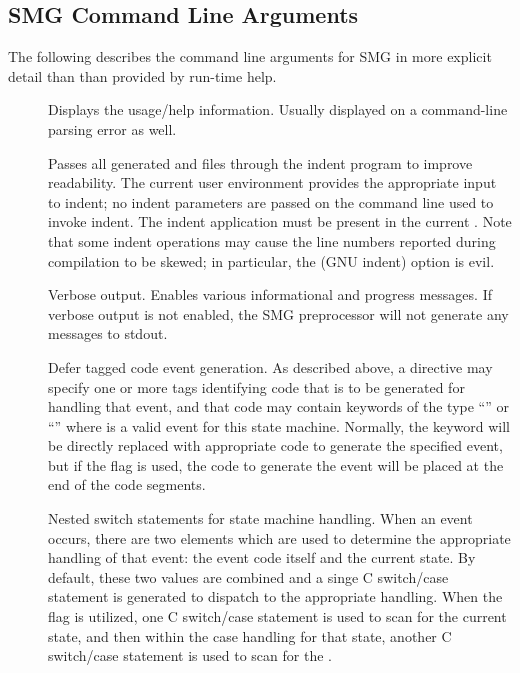 \subsection{SMG Command Line Arguments}

The following describes the command line arguments for SMG in more
explicit detail than than provided by run-time help.

\begin{description}
  
\item[] Displays the usage/help information.  Usually
  displayed on a command-line parsing error as well.
  
\item[] Passes all generated  and  files
  through the indent program to improve readability.  The current user
  environment provides the appropriate input to indent; no indent
  parameters are passed on the command line used to invoke indent.
  The indent application must be present in the current .
  Note that some indent operations may cause the line numbers reported
  during compilation to be skewed; in particular, the  (GNU
  indent) option is evil.
  
\item[] Verbose output.  Enables various informational and
  progress messages.  If verbose output is not enabled, the SMG
  preprocessor will not generate any messages to stdout.
         
\item[] Defer tagged code event generation.  As described
  above, a \TRANS directive may specify one or more tags identifying
  code that is to be generated for handling that event, and that code
  may contain keywords of the type ``'' or
  ``'' where  is a valid event for
  this state machine.  Normally, the keyword will be directly replaced
  with appropriate code to generate the specified event, but if the
   flag is used, the code to generate the event will be
  placed at the end of the \TRANS code segments.
  
\item[] Nested switch statements for state machine handling.
  When an event occurs, there are two elements which are used to
  determine the appropriate handling of that event: the event code
  itself and the current state.  By default, these two values are
  combined and a singe C switch/case statement is generated to
  dispatch to the appropriate handling.  When the  flag is
  utilized, one C switch/case statement is used to scan for the
  current state, and then within the case handling for that state,
  another C switch/case statement is used to scan for the
  .
  

\end{description}
